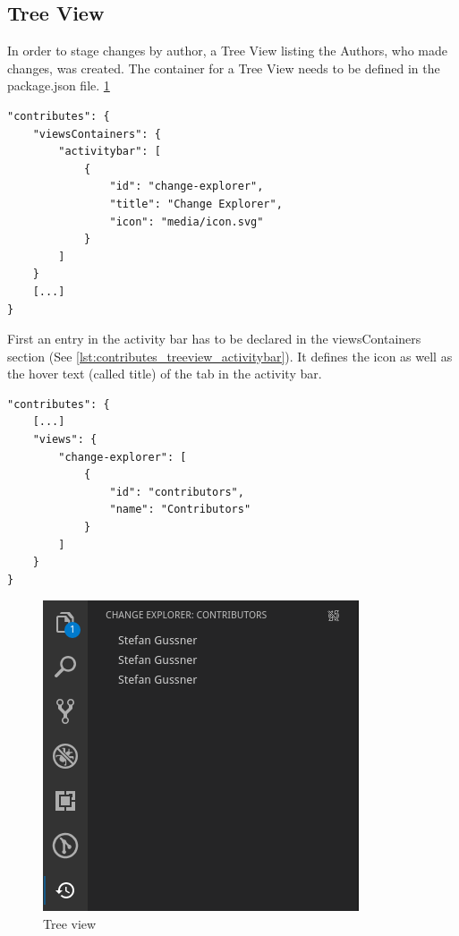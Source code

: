 \subsection{Tree View}

In order to stage changes by author, a Tree View listing the Authors, who made changes, was created.
The container for a Tree View needs to be defined in the package.json file. \ref{fig:treeview}

\begin{minipage}{\linewidth}
\begin{lstlisting}[label={lst:contributes_treeview_activitybar}, caption=Tree View Activitybar]
"contributes": {
    "viewsContainers": {
        "activitybar": [
            {
                "id": "change-explorer",
                "title": "Change Explorer",
                "icon": "media/icon.svg"
            }
        ]
    }
    [...]
}
\end{lstlisting}
\end{minipage}

First an entry in the activity bar has to be declared in the viewsContainers section (See \ref{lst:contributes_treeview_activitybar}). It defines the icon as well as the hover text (called title) of the tab in the activity bar.

\begin{lstlisting}[label={lst:contributes_treeview_view}, caption=Tree View Pannel Definition]
"contributes": {
    [...]
    "views": {
        "change-explorer": [
            {
                "id": "contributors",
                "name": "Contributors"
            }
        ]
    }
}
\end{lstlisting}

\begin{figure}[hb]
    \centering
    \includegraphics{figures/screenshots/treeview.png}
    \caption{Tree view}
    \label{fig:treeview}
\end{figure}

